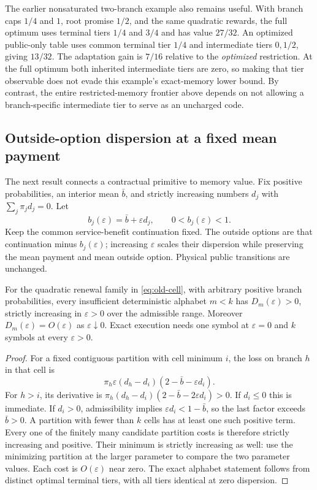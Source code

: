 The earlier nonsaturated two-branch example also remains useful. With branch caps $1/4$ and $1$, root promise $1/2$, and the same quadratic rewards, the full optimum uses terminal tiers $1/4$ and $3/4$ and has value $27/32$. An optimized public-only table uses common terminal tier $1/4$ and intermediate tiers $0,1/2$, giving $13/32$. The adaptation gain is $7/16$ relative to the \emph{optimized} restriction. At the full optimum both inherited intermediate tiers are zero, so making that tier observable does not evade this example's exact-memory lower bound. By contrast, the entire restricted-memory frontier above depends on not allowing a branch-specific intermediate tier to serve as an uncharged code.

\subsection{Outside-option dispersion at a fixed mean payment}
The next result connects a contractual primitive to memory value. Fix positive probabilities, an interior mean $\bar b$, and strictly increasing numbers $d_j$ with $\sum_j\pi_jd_j=0$. Let
\begin{equation}\label{eq:dispersion-family}
 b_j(\varepsilon)=\bar b+\varepsilon d_j,
 \qquad 0<b_j(\varepsilon)<1.
\end{equation}
Keep the common service-benefit continuation fixed. The outside options are that continuation minus $b_j(\varepsilon)$; increasing $\varepsilon$ scales their dispersion while preserving the mean payment and mean outside option. Physical public transitions are unchanged.

\begin{proposition}\label{prop:dispersion}
For the quadratic renewal family in \eqref{eq:old-cell}, with arbitrary positive branch probabilities, every insufficient deterministic alphabet $m<k$ has $D_m(\varepsilon)>0$, strictly increasing in $\varepsilon>0$ over the admissible range. Moreover $D_m(\varepsilon)=O(\varepsilon)$ as $\varepsilon\downarrow0$. Exact execution needs one symbol at $\varepsilon=0$ and $k$ symbols at every $\varepsilon>0$.
\end{proposition}
\begin{proof}
For a fixed contiguous partition with cell minimum $i$, the loss on branch $h$ in that cell is
\[
 \pi_h\varepsilon(d_h-d_i)(2-\bar b-\varepsilon d_i).
\]
For $h>i$, its derivative is $\pi_h(d_h-d_i)(2-\bar b-2\varepsilon d_i)>0$. If $d_i\leq0$ this is immediate. If $d_i>0$, admissibility implies $\varepsilon d_i<1-\bar b$, so the last factor exceeds $\bar b>0$. A partition with fewer than $k$ cells has at least one such positive term. Every one of the finitely many candidate partition costs is therefore strictly increasing and positive. Their minimum is strictly increasing as well: use the minimizing partition at the larger parameter to compare the two parameter values. Each cost is $O(\varepsilon)$ near zero. The exact alphabet statement follows from distinct optimal terminal tiers, with all tiers identical at zero dispersion.\end{proof}


